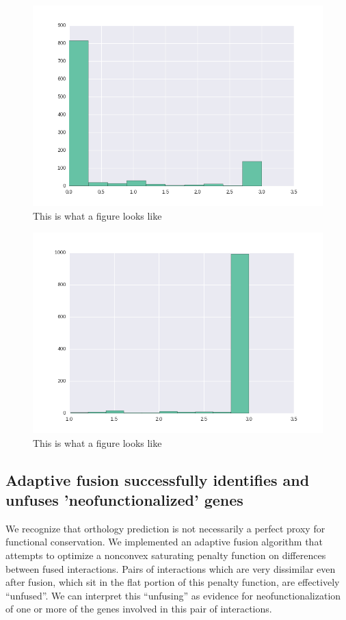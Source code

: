 \documentclass[11pt]{article}
\begin{document}
\begin{figure}
\begin{center}
  \includegraphics[scale=0.45]{scadf.png}
  \caption{\label{fig:figure1} This is what a figure looks like}
  \end{center}
\end{figure}

\begin{figure}
\begin{center}
  \includegraphics[scale=0.45]{scadt.png}
  \caption{\label{fig:figure1} This is what a figure looks like}
  \end{center}
\end{figure}

\subsection{Adaptive fusion successfully identifies and unfuses 'neofunctionalized' genes}
We recognize that orthology prediction is not necessarily a perfect proxy for functional conservation. We implemented an adaptive fusion algorithm that attempts to optimize a nonconvex saturating penalty function on differences between fused interactions. Pairs of interactions which are very dissimilar even after fusion, which sit in the flat portion of this penalty function, are effectively ``unfused''. We can interpret this ``unfusing'' as evidence for neofunctionalization of one or more of the genes involved in this pair of interactions. 
\end{document}
